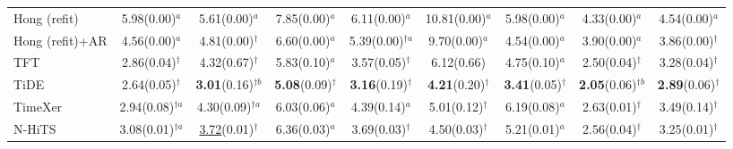 \begin{table}[!t]
\begin{adjustbox}{max width=\linewidth}
\begin{tabular}{lcccccccc}
Hong (refit) & 5.98{\scriptsize\color{gray}(0.00)}$^{a}$ & 5.61{\scriptsize\color{gray}(0.00)}$^{a}$ & 7.85{\scriptsize\color{gray}(0.00)}$^{a}$ & 6.11{\scriptsize\color{gray}(0.00)}$^{a}$ & 10.81{\scriptsize\color{gray}(0.00)}$^{a}$ & 5.98{\scriptsize\color{gray}(0.00)}$^{a}$ & 4.33{\scriptsize\color{gray}(0.00)}$^{a}$ & 4.54{\scriptsize\color{gray}(0.00)}$^{a}$ \\
Hong (refit)+AR & 4.56{\scriptsize\color{gray}(0.00)}$^{a}$ & 4.81{\scriptsize\color{gray}(0.00)}$^{\dagger{}}$ & 6.60{\scriptsize\color{gray}(0.00)}$^{a}$ & 5.39{\scriptsize\color{gray}(0.00)}$^{\dagger{}a}$ & 9.70{\scriptsize\color{gray}(0.00)}$^{a}$ & 4.54{\scriptsize\color{gray}(0.00)}$^{a}$ & 3.90{\scriptsize\color{gray}(0.00)}$^{a}$ & 3.86{\scriptsize\color{gray}(0.00)}$^{\dagger{}}$ \\
TFT & 2.86{\scriptsize\color{gray}(0.04)}$^{\dagger{}}$ & 4.32{\scriptsize\color{gray}(0.67)}$^{\dagger{}}$ & 5.83{\scriptsize\color{gray}(0.10)}$^{a}$ & 3.57{\scriptsize\color{gray}(0.05)}$^{\dagger{}}$ & 6.12{\scriptsize\color{gray}(0.66)} & 4.75{\scriptsize\color{gray}(0.10)}$^{a}$ & 2.50{\scriptsize\color{gray}(0.04)}$^{\dagger{}}$ & 3.28{\scriptsize\color{gray}(0.04)}$^{\dagger{}}$ \\
TiDE & 2.64{\scriptsize\color{gray}(0.05)}$^{\dagger{}}$ & \textbf{3.01}{\scriptsize\color{gray}(0.16)}$^{\dagger{}b}$ & \textbf{5.08}{\scriptsize\color{gray}(0.09)}$^{\dagger{}}$ & \textbf{3.16}{\scriptsize\color{gray}(0.19)}$^{\dagger{}}$ & \textbf{4.21}{\scriptsize\color{gray}(0.20)}$^{\dagger{}}$ & \textbf{3.41}{\scriptsize\color{gray}(0.05)}$^{\dagger{}}$ & \textbf{2.05}{\scriptsize\color{gray}(0.06)}$^{\dagger{}b}$ & \textbf{2.89}{\scriptsize\color{gray}(0.06)}$^{\dagger{}}$ \\
TimeXer & 2.94{\scriptsize\color{gray}(0.08)}$^{\dagger{}a}$ & 4.30{\scriptsize\color{gray}(0.09)}$^{\dagger{}a}$ & 6.03{\scriptsize\color{gray}(0.06)}$^{a}$ & 4.39{\scriptsize\color{gray}(0.14)}$^{a}$ & 5.01{\scriptsize\color{gray}(0.12)}$^{\dagger{}}$ & 6.19{\scriptsize\color{gray}(0.08)}$^{a}$ & 2.63{\scriptsize\color{gray}(0.01)}$^{\dagger{}}$ & 3.49{\scriptsize\color{gray}(0.14)}$^{\dagger{}}$ \\
N-HiTS & 3.08{\scriptsize\color{gray}(0.01)}$^{\dagger{}a}$ & \underline{3.72}{\scriptsize\color{gray}(0.01)}$^{\dagger{}}$ & 6.36{\scriptsize\color{gray}(0.03)}$^{a}$ & 3.69{\scriptsize\color{gray}(0.03)}$^{\dagger{}}$ & 4.50{\scriptsize\color{gray}(0.03)}$^{\dagger{}}$ & 5.21{\scriptsize\color{gray}(0.01)}$^{a}$ & 2.56{\scriptsize\color{gray}(0.04)}$^{\dagger{}}$ & 3.25{\scriptsize\color{gray}(0.01)}$^{\dagger{}}$ \\

\end{tabular}
\end{adjustbox}
\end{table}
